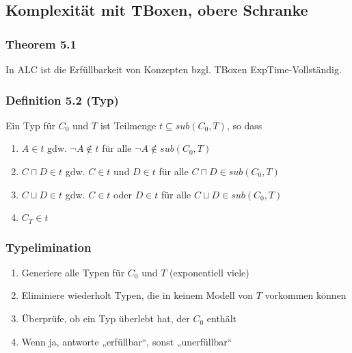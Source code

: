 \subsection{Komplexität mit TBoxen, obere
Schranke}\label{komplexituxe4t-mit-tboxen-obere-schranke}

\subsubsection{Theorem 5.1}\label{theorem-5.1}

In ALC ist die Erfüllbarkeit von Konzepten bzgl. TBoxen
ExpTime-Vollständig.

\subsubsection{Definition 5.2 (Typ)}\label{definition-5.2-typ}

Ein Typ für $C_{0}$ und $T$ ist Teilmenge
$t \subseteq sub\left( C_{0},T \right)$, so dass

\begin{enumerate}
\def\labelenumi{\arabic{enumi}.}
\item
  $A \in t$ gdw. $\neg A \notin t$ für alle
  $\neg A \notin sub\left( C_{0},T \right)$
\item
  $C \sqcap D \in t$ gdw. $C \in t$ und $D \in t$ für alle
  $C \sqcap D \in sub\left( C_{0},T \right)$
\item
  $C \sqcup D \in t$ gdw. $C \in t$ oder $D \in t$ für alle
  $C \sqcup D \in sub\left( C_{0},T \right)$
\item
  $C_{T} \in t$
\end{enumerate}

\subsubsection{Typelimination}\label{typelimination}

\begin{enumerate}
\def\labelenumi{\arabic{enumi}.}
\item
  Generiere alle Typen für $C_{0}$ und $T$ (exponentiell viele)
\item
  Eliminiere wiederholt Typen, die in keinem Modell von $T$ vorkommen
  können
\item
  Überprüfe, ob ein Typ überlebt hat, der $C_{0}$ enthält
\item
  Wenn ja, antworte „erfüllbar``, sonst „unerfüllbar``
\end{enumerate}

